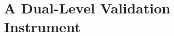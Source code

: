 \documentclass[runningheads]{llncs}
\begin{document}
\section{A Dual-Level Validation Instrument}\label{sec:instrument}

\end{document}
